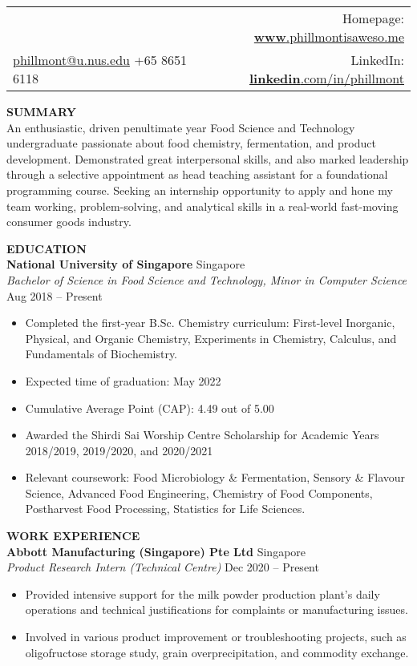 \documentclass[a4paper, 11pt]{article}
\makeatletter
\newcommand{\interspace}{\vspace{10pt}}
\newcommand{\name}{Phillmont Muktar}
\newcommand{\cname}{\begin{CJK*}{UTF8}{zhsong}郑传期\end{CJK*}}
\newcommand{\tel}{+65 8651 6118}
\newcommand{\email}{\href{mailto:phillmont@u.nus.edu}{phillmont@u.nus.edu}}
\newcommand{\linkedin}{\href{http://linkedin.com/in/phillmont}{\textbf{linkedin}.com/in/phillmont}}
\newcommand{\mysite}{\href{https://phillmontisaweso.me}{\textbf{www}.phillmontisaweso.me}}
\makeatother
\begin{document}
	\sffamily
	\begin{tabularx}{\linewidth}{@{}X r@{}}
		{\Large \textbf{\name, \cname}} & Homepage: \mysite\\ 
		\email{} \textbar\textbar\space \tel & LinkedIn: \linkedin\\
	\end{tabularx}
	
	\interspace
	
	\textbf{\large SUMMARY} \hrulefill \\
 	An enthusiastic, driven penultimate year Food Science and Technology undergraduate passionate about food chemistry, fermentation, and product development. Demonstrated great interpersonal skills, and also marked leadership through a selective appointment as head teaching assistant for a foundational programming course. Seeking an internship opportunity to apply and hone my team working, problem-solving, and analytical skills in a real-world fast-moving consumer goods industry.

	\interspace

	\textbf{\large EDUCATION} \hrulefill \\
	\textbf{National University of Singapore} \hfill Singapore\\
	\textit{Bachelor of Science in Food Science and Technology, Minor in Computer Science} \hfill Aug 2018 -- Present
	\begin{itemize}[leftmargin=*, noitemsep, topsep=0pt]
		\item Completed the first-year B.Sc. Chemistry curriculum: First-level Inorganic, Physical, and Organic Chemistry, Experiments in Chemistry, Calculus, and Fundamentals of Biochemistry. 
		\item Expected time of graduation: May 2022
		\item Cumulative Average Point (CAP): 4.49 out of 5.00
		\item Awarded the Shirdi Sai Worship Centre Scholarship for Academic Years 2018/2019, 2019/2020, and 2020/2021
		\item Relevant coursework: Food Microbiology \& Fermentation, Sensory \& Flavour Science, Advanced Food Engineering, Chemistry of Food Components, Postharvest Food Processing, Statistics for Life Sciences. 
	\end{itemize}
	
	\interspace
	
	\textbf{\large WORK EXPERIENCE} \hrulefill \\
	\textbf{Abbott Manufacturing (Singapore) Pte Ltd} \hfill Singapore\\
	\textit{Product Research Intern (Technical Centre)} \hfill Dec 2020 -- Present
	\begin{itemize}[leftmargin=*, noitemsep, topsep=0pt]
		\item Provided intensive support for the milk powder production plant's daily operations and technical justifications for complaints or manufacturing issues.
		\item Involved in various product improvement or troubleshooting projects, such as oligofructose storage study, grain overprecipitation, and commodity exchange.
	\end{itemize}
\end{document}
